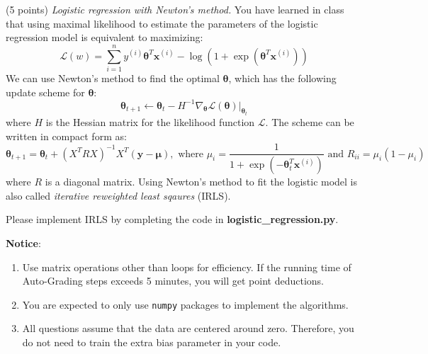 \documentclass[a4paper, 12pt]{exam}
\begin{document}
\begin{questions}
		\question (5 points) \emph{Logistic regression with Newton's method. } You have learned in class that using maximal likelihood to estimate the parameters of the logistic regression model is equivalent to maximizing:
		\begin{equation*}
		\mathcal{L}(w) = \sum_{i=1}^n y^{(i)} \bm{\theta}^T \bm{x}^{(i)} - \log ( 1 + \exp(\bm{\theta}^T \bm{x}^{(i)}))
		\end{equation*}
		We can use Newton's method to find the optimal $\bm{\theta}$, which has the following update scheme for $\bm{\theta}$:
		\begin{equation*}
		\bm{\theta}_{t+1} \leftarrow \bm{\theta}_t - H^{-1} \nabla_{\bm{\theta}} \mathcal{L}(\bm{\theta})|_{\bm{\theta}_t}
		\end{equation*}
		where $H$ is the Hessian matrix for the likelihood function $\mathcal{L}$.
		The scheme can be written in compact form as:
		\begin{equation*}
		\bm{\theta}_{t+1} = \bm{\theta}_t + (X^TRX)^{-1} X^T(\bm{y}-\bm{\mu}), \textrm{ where } \mu_i = \frac{1}{1+\exp(-\bm{\theta}_t^T\bm{x}^{(i)})} \textrm{ and } R_{ii} = \mu_i ( 1 - \mu_i)
		\end{equation*}
		where $R$ is a diagonal matrix. Using Newton's method to fit the logistic model is also called {\em iterative reweighted least sqaures} (IRLS).
		
		Please implement IRLS by completing the code in \textbf{logistic\_regression.py}.
		
	\end{questions}
	
	
	\nocite{*}
	\begin{flushleft}
		\textbf{Notice}: \\
		\begin{enumerate}
			\item Use matrix operations other than loops for efficiency. If the running time of Auto-Grading steps exceeds 5 minutes, you will get point deductions.
			\item You are expected to only use \texttt{numpy} packages to implement the algorithms.
			\item All questions assume that the data are centered around zero. Therefore, you do not need to train the extra bias parameter in your code.
		\end{enumerate}
	\end{flushleft}
	
\end{document}
